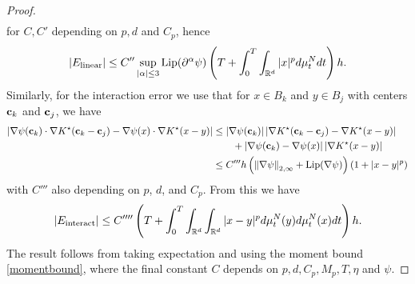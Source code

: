 \documentclass[english,reqno]{amsart}
\begin{document}
\begin{proof}
\begin{align*}
\end{align*}
for $C,C'$ depending on $p,d$ and $C_p$, hence
\begin{equation}\label{elin}
|E_{\text{linear}}| \leq C''\sup_{|\alpha|\leq 3}\text{Lip}(\partial^\alpha\psi)\left(T+\int_0^T\int_{\mathbb{R}^d}|x|^pd\mu^N_tdt \right)h.
\end{equation}
Similarly, for the interaction error we use that for $x\in B_k$ and $y\in B_j$ with centers $\mathbf{c}_k$ and $\mathbf{c}_j$, we have 
\begin{align*}
\left\vert\nabla \psi(\mathbf{c}_k)\cdot\nabla K^\star(\mathbf{c}_k-\mathbf{c}_j)-\nabla \psi(x)\cdot \nabla K^\star(x-y)\right\vert &\leq |\nabla \psi(\mathbf{c}_k)|\left\vert \nabla K^\star(\mathbf{c}_k-\mathbf{c}_j)-\nabla K^\star(x-y)\right\vert\\
&\qquad +\left\vert \nabla\psi(\mathbf{c}_k)-\nabla \psi(x)\right\vert\left\vert \nabla K^\star(x-y)\right\vert\\
&\leq C'''h\left(\left\Vert {\nabla \psi} \right\Vert_{2,\infty}+\text{Lip}(\nabla \psi)\right)(1+|x-y|^p)
\end{align*}
with $C'''$ also depending on $p$, $d$, and $C_p$. From this we have
\begin{equation}\label{einteract}
|E_\text{interact}|\leq C''''\left(T+\int_0^T\int_{\mathbb{R}^d}\int_{\mathbb{R}^d}|x-y|^pd\mu^N_t(y)d\mu^N_t(x)dt\right)h.
\end{equation}
The result follows from taking expectation and using the moment bound \eqref{momentbound}, where the final constant $C$ depends on $p,d,C_p,M_p,T,\eta$ and $\psi$.


\end{proof}
\end{document}
